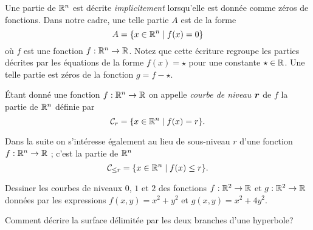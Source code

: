 \documentclass[11pt, a4paper]{article}
\begin{document}
Une partie de $\mathbb{R}^n$ est décrite \emph{implicitement} lorsqu'elle est
donnée comme zéros de fonctions. Dans notre cadre, une telle partie
$A$ est de la forme
\[
  A = \{ x \in \mathbb{R}^n \mid f(x) = 0\}
\]
où $f$ est une fonction $f : \mathbb{R}^n \to \mathbb{R}$. Notez que cette écriture
regroupe les parties décrites par les équations de la forme
$f(x) = \star$ pour une constante $\star \in \mathbb{R}$. Une telle partie est
zéros de la fonction $g = f - \star$.
\begin{defn}
  Étant donné une fonction $f : \mathbb{R}^n \to \mathbb{R}$ on appelle \emph{courbe
    de niveau $\boldsymbol{r}$} de $f$ la partie de $\mathbb{R}^n$ définie par
  \[
    \mathcal{C}_r = \{ x \in \mathbb{R}^n \mid f(x) = r\}.
  \]
\end{defn}
Dans la suite on s'intéresse également au lieu de sous-niveau $r$
d'une fonction $f : \mathbb{R}^n \to \mathbb{R}$ ; c'est la partie de $\mathbb{R}^n$
\[
  \mathcal{C}_{\leq r} = \{ x \in \mathbb{R}^n \mid f(x) \leq r \}.
\]
\begin{question}
  Dessiner les courbes de niveaux $0$, $1$ et $2$ des fonctions
  $f : \mathbb{R}^2 \to \mathbb{R}$ et $g : \mathbb{R}^2 \to \mathbb{R}$ données par les expressions
  $f(x, y) = x^2 + y^2$ et $g(x, y) = x^2 + 4y^2$.
\end{question}
\begin{question}
  Comment décrire la surface délimitée par les deux branches d'une
  hyperbole?
\end{question}
\end{document}
